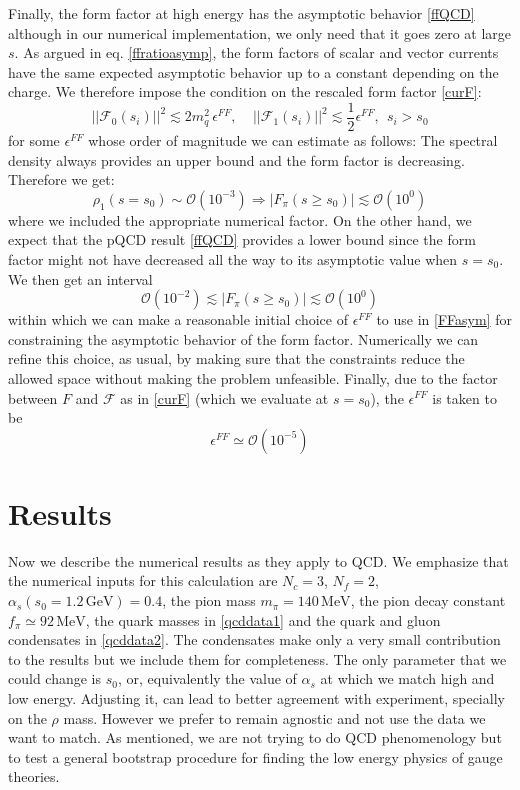 \documentclass[12pt,letterpaper]{article}
\newcommand{\beq}{\begin{equation}}
\newcommand{\eeq}{\end{equation}}
\newcommand{\half}{\ensuremath{\frac{1}{2}}}
\newcommand{\MeV}{\ensuremath{\mbox{MeV}}}
\newcommand{\GeV}{\ensuremath{\mbox{GeV}}}
\begin{document}
\medskip

Finally, the form factor at high energy has the asymptotic behavior \eqref{ffQCD} although in our numerical implementation, we only need that it goes zero at large $s$. As argued in eq. \eqref{ffratioasymp}, the form factors of scalar and vector currents have the same expected asymptotic behavior up to a constant depending on the charge. We therefore impose the condition on the rescaled form factor \eqref{curF}:
\beq\label{FFasym}
||\mathcal{F}_0(s_i)||^2 \lesssim 2 m_q^2\, \epsilon^{FF}, \ \ \ \ \ ||\mathcal{F}_1(s_i)||^2\lesssim \half \epsilon^{FF}, \ \ s_i>s_0
\eeq
for some $\epsilon^{FF}$ whose order of magnitude we can estimate as follows: The spectral density always provides an upper bound and the form factor is decreasing. Therefore we get:  
\begin{equation}\label{h44}
\rho_1(s=s_0)\sim \mathcal{O}(10^{-3}) \Rightarrow |F_{\pi}(s\ge s_0)|\lesssim \mathcal{O}(10^{0})
\end{equation}
where we included the appropriate numerical factor. On the other hand, we expect that the pQCD result \eqref{ffQCD} provides a lower bound since the form factor might not have decreased all the way to its asymptotic value when $s=s_0$. We then get an interval
\beq  \label{h43b}
 \mathcal{O}(10^{-2}) \lesssim|F_{\pi}(s\ge s_0)|\lesssim \mathcal{O}(10^{0})
\eeq
within which we can make a reasonable initial choice of $\epsilon^{FF}$ to use in \eqref{FFasym} for constraining the asymptotic behavior of the form factor. Numerically we can refine this choice, as usual, by making sure that the constraints reduce the allowed space without making the problem unfeasible.    
Finally, due to the factor between $F$ and $\mathcal{F}$ as in \eqref{curF} (which we evaluate at $s=s_0$), the $\epsilon^{FF}$ is taken to be
\begin{equation}
\epsilon^{FF}\simeq \mathcal{O}(10^{-5})
\end{equation}

\section{Results}

Now we describe the numerical results as they apply to QCD. We emphasize that the numerical inputs for this calculation are $N_c=3$, $N_f=2$, $\alpha_s(s_0=1.2\,\GeV)=0.4$, the pion mass $m_\pi=140\,\MeV$, the pion decay constant $f_{\pi}\simeq 92\,\MeV$, the quark masses in \eqref{qcddata1} and the quark and gluon condensates in \eqref{qcddata2}. The condensates make only a very small contribution to the results but we include them for completeness. The only parameter that we could change is $s_0$, or, equivalently the value of $\alpha_s$ at which we match high and low energy. Adjusting it, can lead to better agreement with experiment, specially on the $\rho$ mass. However we prefer to remain agnostic and not use the data we want to match. As mentioned, we are not trying to do QCD phenomenology but to test a general bootstrap procedure for finding the low energy physics of gauge theories.      
\end{document}
